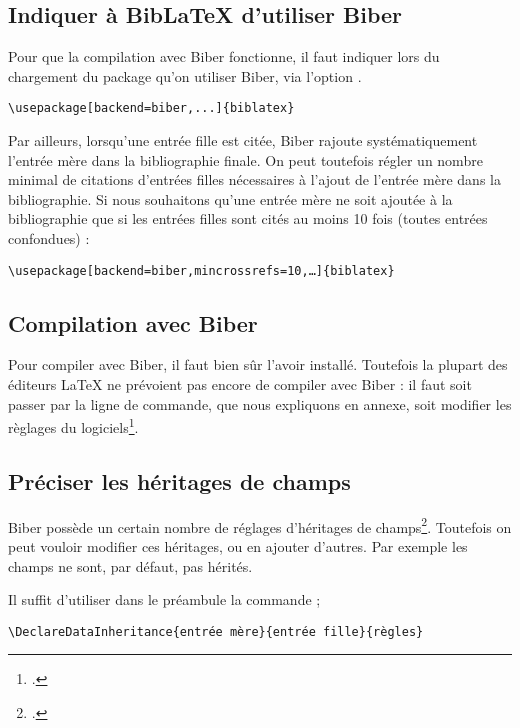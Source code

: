 \subsection{Indiquer à BibLaTeX d'utiliser Biber}

Pour que la compilation avec Biber fonctionne, il faut indiquer lors du chargement du package qu'on utiliser Biber, via l'option .

\begin{verbatim}
\usepackage[backend=biber,...]{biblatex}
\end{verbatim}

Par ailleurs, lorsqu'une entrée fille est citée, Biber rajoute systématiquement l'entrée mère dans la bibliographie finale. On peut toutefois régler un nombre minimal de citations d'entrées filles nécessaires à l'ajout de l'entrée mère dans la bibliographie. Si nous souhaitons qu'une entrée mère ne soit ajoutée à la bibliographie que si les entrées filles sont cités au moins 10 fois (toutes entrées confondues) :


\begin{verbatim}
\usepackage[backend=biber,mincrossrefs=10,…]{biblatex}
\end{verbatim}

\subsection{Compilation avec Biber}

Pour compiler avec Biber, il faut bien sûr l'avoir installé. Toutefois la plupart des éditeurs \LaTeX{} ne prévoient pas encore de compiler avec Biber : il faut soit passer par la ligne de commande, que nous expliquons en annexe, soit modifier les règlages du logiciels\footcite[On peut trouver comment faire pour quelques logiciels à cette adresse]{biber_logiciels}.
\subsection{Préciser les héritages de champs}

Biber possède un certain nombre de réglages d'héritages de champs\footcite{biblatex_crossrefsetup}. Toutefois on peut vouloir modifier ces héritages, ou en ajouter d'autres. Par exemple les champs  ne sont, par défaut, pas hérités. 

Il suffit d'utiliser dans le préambule la commande ;

\begin{verbatim}
\DeclareDataInheritance{entrée mère}{entrée fille}{règles}
\end{verbatim}

